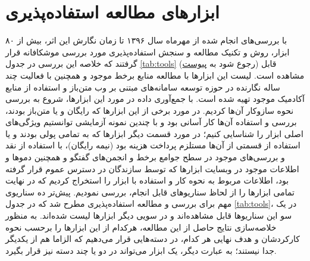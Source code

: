 \section{ابزارهای مطالعه استفاده‌پذیری}
با بررسی‌های انجام شده از مهرماه سال ۱۳۹۶ تا زمان نگارش این اثر، بیش از ۸۰ ابزار، روش و تکنیک مطالعه و سنجش استفاده‌پذیری مورد بررسی موشکافانه قرار گرفتند که خلاصه این بررسی در جدول
\ref{tab:tools}
(رجوع شود به
\hyperref[sec:appendix]{پیوست})
قابل مشاهده است. لیست این ابزارها با مطالعه منابع برخط موجود و همچنین با فعالیت چند ساله نگارنده در حوزه توسعه سامانه‌های مبتنی بر وب متن‌باز و استفاده از منابع آکادمیک موجود تهیه شده است. با جمع‌آوری داده در مورد این ابزارها، شروع به بررسی نحوه سازوکار آن‌ها کردیم. در مورد برخی از این ابزارها که رایگان و یا متن‌باز بودند، بررسی و استفاده آن‌ها کار آسانی بود و با چندین نمونه آزمایشی توانستیم ویژگی‌های اصلی ابزار را شناسایی کنیم؛ در مورد قسمت دیگر ابزارها که به تمامی پولی بودند و یا استفاده از قسمتی از آن‌ها مستلزم پرداخت هزینه بود (نیمه رایگان)،
با استفاده از نقد و بررسی‌های موجود در سطح جوامع برخط و انجمن‌های گفتگو و همچنین دموها و اطلاعات موجود در وبسایت ابزارها که توسط سازندگان در دسترس عموم قرار گرفته بود، اطلاعات مربوط به نحوه کار و استفاده با ابزار را استخراج کردیم که در نهایت تمامی ابزارها را از لحاظ سناریوهای قابل انجام، بررسی نمودیم. پیش‌تر ده سناریوی مهم برای بررسی و مطالعه استفاده‌پذیری مطرح شد که در جدول
\ref{tab:tools}،
در یک سو این سناریوها قابل مشاهده‌اند و در سویی دیگر ابزارها لیست شده‌اند. به منظور خلاصه‌سازی نتایج حاصل از این مطالعه، هرکدام از این ابزارها را برحسب نحوه کارکردشان و هدف نهایی هر کدام، در دسته‌هایی قرار می‌دهیم که الزاما هم از یکدیگر جدا نیستند؛ به عبارت دیگر، یک ابزار می‌تواند در دو یا چند دسته نیز قرار بگیرد.


